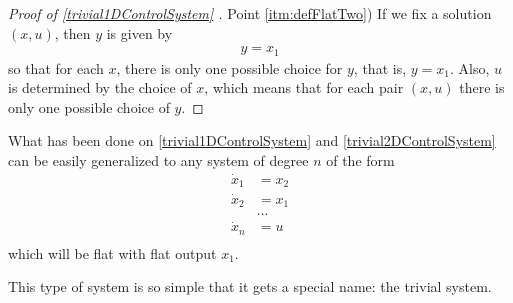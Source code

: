 \documentclass[12pt]{article}
\begin{document}
\begin{proof}[ Proof  of \ref{trivial1DControlSystem} ]
  Point \ref{itm:defFlatTwo}) If we fix a solution $(x,u)$, then $y$ is
  given by
  \begin{equation}\begin{aligned}
    y = x_1
  \end{aligned}\end{equation}
  so that for each $x$, there is only one possible choice for $y$, that
  is, $y=x_1$.
  Also, $u$ is determined by the choice of $x$, which means that for
  each pair $(x,u)$ there is only one possible choice of $y$. 
\end{proof}

\begin{remark}
  What has been done on \ref{trivial1DControlSystem} and \ref{trivial2DControlSystem} can be easily generalized to any system of
  degree $n$ of the form
  \begin{equation}\begin{aligned}
    \dot{x}_1 &= x_2 \\
    \dot{x}_2 &= x_1 \\
    &\ldots \\
    \dot{x}_n &= u \\
  \end{aligned}\end{equation}
  which will be flat with flat output $x_1$.
  
  This type of system is so simple that it gets a special name: the trivial system.
\end{remark}
\end{document}
